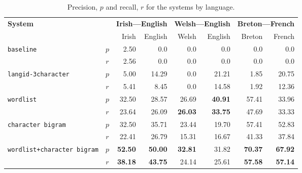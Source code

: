 \documentclass[11pt]{article}
\begin{document}
\begin{table}
\begin{center}
\begin{tabular}{|lc|r|r|r|r|r|r|}
\hline
\multirow{2}{*}{\textbf{System}}            & & \multicolumn{2}{c}{\textbf{Irish---English}} & \multicolumn{2}{|c|}{\textbf{Welsh---English}} & \multicolumn{2}{c|}{\textbf{Breton---French}}  \\\cline{3-8}
                                          &      &  Irish &  English & Welsh  & English & Breton & French \\
\hline 
\multirow{2}{*}{\texttt{baseline}}        &  $p$ &  2.50   & 0.0      & 0.0   & 0.0 & 0.0 & 0.0 \\
                                          & $r$  & 2.56    & 0.0      & 0.0   & 0.0 & 0.0 & 0.0 \\
\hline
\multirow{2}{*}{\texttt{langid-3character}}         &  $p$ &  5.00   & 14.29    & 0.0   & 21.21 & 1.85 & 20.75 \\
                                          & $r$  & 5.41    & 8.45     & 0.0   & 14.58 & 1.92 & 12.36 \\
\hline
\multirow{2}{*}{\texttt{wordlist}}        &  $p$ &  32.50 & 28.57     & 26.69 & {\bf 40.91} & 57.41 & 33.96 \\
                                          & $r$  & 23.64  & 26.09     & {\bf 26.03} & {\bf 33.75} & 47.69 & 33.33 \\
\hline
\multirow{2}{*}{\texttt{character bigram}}          &  $p$ &  32.50   & 35.71   & 23.44 & 19.70  & 57.41 & 52.83 \\
                                          & $r$  & 22.41    & 26.79   & 15.31 & 16.67 & 41.33 & 37.84 \\
\hline
\multirow{2}{*}{\texttt{wordlist+character bigram}} &  $p$ &  {\bf 52.50}   & {\bf 50.00}   & {\bf 32.81} & 31.82 & {\bf 70.37} & {\bf 67.92} \\
                                          & $r$  & {\bf 38.18}    & {\bf 43.75}   & 24.14 & 25.61 & {\bf 57.58} & {\bf 57.14} \\
\hline
\end{tabular}
\end{center}
\caption{Precision, $p$ and recall, $r$ for the systems by language.}
\label{table:precisionrecall}

\end{table}
\end{document}
